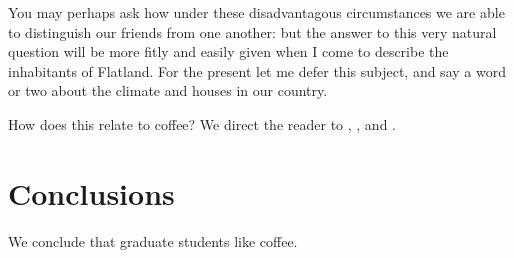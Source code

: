 \documentclass[edeposit,fullpage]{uiucthesis2014}
\begin{document}
You may perhaps ask how under these disadvantagous circumstances we are
able to distinguish our friends from one another: but the answer to
this very natural question will be more fitly and easily given when I
come to describe the inhabitants of Flatland.  For the present let me
defer this subject, and say a word or two about the climate and houses
in our country.

How does this relate to coffee? We direct the reader to \cite{Trembly98}, \cite{Childish07}, and \cite{Presso10}.






\chapter{Conclusions}

We conclude that graduate students like coffee.

\appendix*



\backmatter



\end{document}
